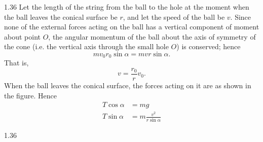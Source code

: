 \begin{solution}{1.36}
Let the length of the string from the ball to the hole at the moment when the ball leaves the conical surface be $r$, and let the speed of the ball be $v$. Since none of the external forces acting on the ball has a vertical component of moment about point $O$, the angular momentum of the ball about the axis of symmetry of the cone (i.e. the vertical axis through the small hole $O$) is conserved; hence
\[
mv_0r_0\sin\alpha=mvr\sin\alpha.
\]
That is,
\begin{equation}
v=\frac{r_0}{r}v_0. \tag{1}
\end{equation}
When the ball leaves the conical surface, the forces acting on it are as shown in the figure. Hence
\begin{align}
T\cos\alpha &= mg \tag{2}\\
T\sin\alpha &= m\frac{v^2}{r\sin\alpha} \tag{3}
\end{align}

\begin{figbox}{1.36}
\end{figbox}


\end{solution}
